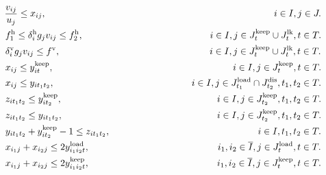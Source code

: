 \begin{center}
\begin{align}
&\hspace{2.9em} \frac{v_{ij}} {u_j} \leq x_{ij}, \hspace{24.37em} i \in I, j \in J. \\
&\hspace{3.0em} {f^{\rm{h}}_1} \leq {\delta_{i}^{\rm{h}}}{g_{j}} {v_{ij}} \leq f^{\rm{h}}_2, \hspace{13.55em} i \in I, j \in J_{t}^{\rm{keep}} \cup J_{t}^{\rm{lk}}, t \in T. \\
&\hspace{3.0em} {\delta_{i}^{\rm{v}}}{g_{j}} {v_{ij}} \leq f^{\rm{v}}, \hspace{15.98em} i \in I, j \in J_{t}^{\rm{keep}} \cup J_{t}^{\rm{lk}}, t \in T.  \\
&\hspace{3.0em} {x_{ij}} \leq {y_{it}^{\rm{keep}}}, \hspace{19.18em} i \in I, j \in J_{t}^{\rm{keep}}, t \in T. \\
&\hspace{3.0em} {x_{ij}} \leq {y_{it_1t_2}}, \hspace{14.68em} i \in I, j \in J_{t_1}^{\rm{load}} \cap J_{t_2}^{\rm{dis}}, {t_1},{t_2} \in T. \\
&\hspace{3.0em} {z_{it_1t_2}} \leq {y_{it_2}^{\rm{keep}}} ,  \hspace{16.57em} i \in I, j \in J_{t_2}^{\rm{keep}}, t_1,t_2 \in T. \\
&\hspace{3.0em} {z_{it_1t_2}} \leq {y_{it_1t_2}} ,  \hspace{16.49em} i \in I, j \in J_{t_2}^{\rm{keep}}, t_1,t_2 \in T. \\
&\hspace{3.0em} {y_{it_1t_2}} + y_{it_2}^{\rm{keep}} - 1 \leq {z_{it_1t_2}}, \hspace{15.79em} i \in I, t_1,t_2 \in T. \\
&\hspace{3.0em} {x_{i_1j}} + {x_{i_2j}} \leq 2{y_{i_1i_2t}^{\rm{load}}}, \hspace{13.71em} i_1, i_2 \in \overline{I}, j \in J_{t}^{\rm{load}}, t \in T. \\
&\hspace{3.0em} {x_{i_1j}} + {x_{i_2j}} \leq 2{y_{i_1i_2t}^{\rm{keep}}}, \hspace{13.64em} i_1, i_2 \in \overline{I}, j \in J_{t}^{\rm{keep}}, t \in T. \\

\end{align}
\end{center}
